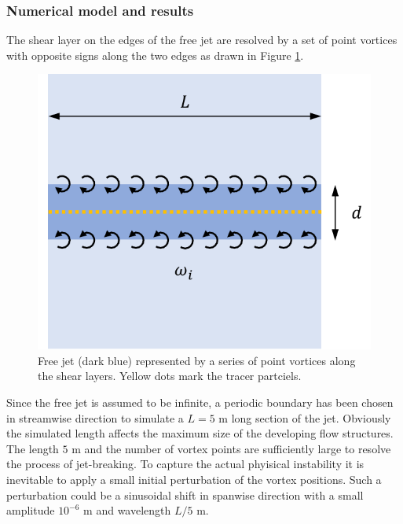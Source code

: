 \documentclass[a4paper,12pt,openany]{book}
\theoremstyle{break}
\begin{document}
\subsubsection{Numerical model and results}
The shear layer on the edges of the free jet are resolved by a set of point vortices with opposite signs along the two edges as drawn in Figure \ref{fig:shear_geom}.
\begin{figure}[H]
  \includegraphics[scale=0.6]{shear_geom.pdf}
  \centering
  \caption{Free jet (dark blue) represented by a series of point vortices along the shear layers. Yellow dots mark the tracer partciels. }
  \label{fig:shear_geom}
\end{figure}\vspace*{3pt}
Since the free jet is assumed to be infinite, a periodic boundary has been chosen in streamwise direction to simulate a $L=5$ m long section of the jet. Obviously the simulated length affects the maximum size of the developing flow structures. The length $5$ m and the number of vortex points are sufficiently large to resolve the process of jet-breaking. To capture the actual phyisical instability it is inevitable to apply a small initial perturbation of the vortex positions. Such a perturbation could be a sinusoidal shift in spanwise direction with a small amplitude $10^{-6}$ m and wavelength $L/5$ m.
\end{document}
